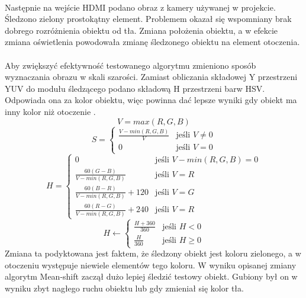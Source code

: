 \paragraph*{}
Następnie na wejście HDMI podano obraz z kamery używanej w projekcie. Śledzono zielony prostokątny element. Problemem okazał się wspomniany brak dobrego rozróżnienia obiektu od tła. Zmiana położenia obiektu, a w efekcie zmiana oświetlenia powodowała zmianę śledzonego obiektu na element otoczenia.

\paragraph*{}
Aby zwiększyć efektywność testowanego algorytmu zmieniono sposób wyznaczania obrazu w skali szarości. Zamiast obliczania składowej Y przestrzeni YUV do modułu śledzącego podano składową H przestrzeni barw HSV. Odpowiada ona za kolor obiektu, więc powinna dać lepsze wyniki gdy obiekt ma inny kolor niż otoczenie \cite{Kryjak}.
\begin{equation}
V=max(R,G,B)
\end{equation}
\begin{equation}
S=
	\begin{cases}
	\frac{V-min(R,G,B)}{V} &\text{jeśli } V \neq 0\\
	0 &\text{jeśli } V=0
	\end{cases}
\end{equation}
\begin{equation}
H=
	\begin{cases}
	0 &\text{jeśli } V-min(R,G,B)=0\\
	\frac{60(G-B)}{V-min(R,G,B)} &\text{jeśli } V=R\\
	\frac{60(B-R)}{V-min(R,G,B)}+120 &\text{jeśli } V=G\\
	\frac{60(R-G)}{V-min(R,G,B)}+240 &\text{jeśli } V=R
	\end{cases}
\end{equation}
\begin{equation}
H \leftarrow
	\begin{cases}
	\frac{H+360}{360} &\text{jeśli } H<0\\
	\frac{H}{360} &\text{jeśli } H \geqslant 0
	\end{cases}
\end{equation}
Zmiana ta podyktowana jest faktem, że śledzony obiekt jest koloru zielonego, a w otoczeniu występuje niewiele elementów tego koloru. W wyniku opisanej zmiany algorytm Mean-shift zaczął dużo lepiej śledzić testowy obiekt. Gubiony był on w wyniku zbyt nagłego ruchu obiektu lub gdy zmieniał się kolor tła.